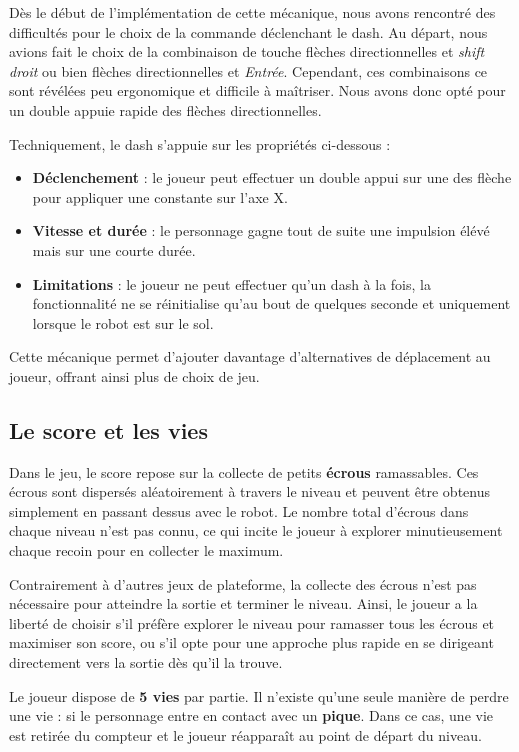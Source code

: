 \documentclass[10pt]{report}
\begin{document}
Dès le début de l'implémentation de cette mécanique, nous avons rencontré des difficultés pour le choix de la commande déclenchant le dash. Au départ, nous avions fait le choix de la combinaison de touche flèches directionnelles et \emph{shift droit} ou bien flèches directionnelles et \emph{Entrée}. Cependant, ces combinaisons ce sont révélées peu ergonomique et difficile à maîtriser. Nous avons donc opté pour un double appuie rapide des flèches directionnelles.

Techniquement, le dash s'appuie sur les propriétés ci-dessous :
\begin{itemize}
  \item \textbf{Déclenchement} : le joueur peut effectuer un double appui sur une des flèche pour appliquer une constante sur l'axe X.
  \item \textbf{Vitesse et durée} : le personnage gagne tout de suite une impulsion élévé mais sur une courte durée.
  \item \textbf{Limitations} : le joueur ne peut effectuer qu'un dash à la fois, la fonctionnalité ne se réinitialise qu'au bout de quelques seconde et uniquement lorsque le robot est sur le sol. 
\end{itemize}

Cette mécanique permet d'ajouter davantage d'alternatives de déplacement au joueur, offrant ainsi plus de choix de jeu. 

\subsection{Le score et les vies}
Dans le jeu, le score repose sur la collecte de petits \textbf{écrous} ramassables. Ces écrous sont dispersés aléatoirement à travers le niveau et peuvent être obtenus simplement en passant dessus avec le robot. Le nombre total d'écrous dans chaque niveau n'est pas connu, ce qui incite le joueur à explorer minutieusement chaque recoin pour en collecter le maximum.

Contrairement à d'autres jeux de plateforme, la collecte des écrous n'est pas nécessaire pour atteindre la sortie et terminer le niveau. Ainsi, le joueur a la liberté de choisir s’il préfère explorer le niveau pour ramasser tous les écrous et maximiser son score, ou s’il opte pour une approche plus rapide en se dirigeant directement vers la sortie dès qu'il la trouve.

Le joueur dispose de \textbf{5 vies} par partie. Il n'existe qu'une seule manière de perdre une vie : si le personnage entre en contact avec un \textbf{pique}. Dans ce cas, une vie est retirée du compteur et le joueur réapparaît au point de départ du niveau.
\end{document}
